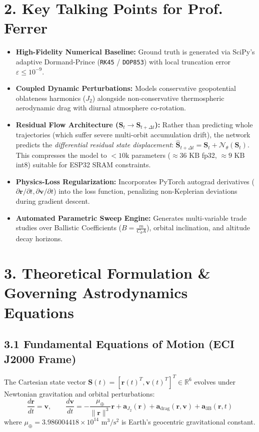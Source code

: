 \documentclass[11pt,a4paper]{article}
\begin{document}
\section*{2. Key Talking Points for Prof. Ferrer}
\begin{itemize}[leftmargin=*,itemsep=2pt]
    \item \textbf{High-Fidelity Numerical Baseline:} Ground truth is generated via SciPy's adaptive Dormand-Prince (\texttt{RK45} / \texttt{DOP853}) with local truncation error $\varepsilon \le 10^{-9}$.
    \item \textbf{Coupled Dynamic Perturbations:} Models conservative geopotential oblateness harmonics ($J_2$) alongside non-conservative thermospheric aerodynamic drag with diurnal atmosphere co-rotation.
    \item \textbf{Residual Flow Architecture ($\mathbf{S}_t \to \mathbf{S}_{t+\Delta t}$):} Rather than predicting whole trajectories (which suffer severe multi-orbit accumulation drift), the network predicts the \textit{differential residual state displacement}: $\hat{\mathbf{S}}_{t+\Delta t} = \mathbf{S}_t + \mathcal{N}_\theta(\mathbf{S}_t)$. This compresses the model to $<10\text{k}$ parameters ($\approx 36\text{ KB}$ fp32, $\approx 9\text{ KB}$ int8) suitable for ESP32 SRAM constraints.
    \item \textbf{Physics-Loss Regularization:} Incorporates PyTorch autograd derivatives ($\partial \mathbf{r}/\partial t, \partial \mathbf{v}/\partial t$) into the loss function, penalizing non-Keplerian deviations during gradient descent.
    \item \textbf{Automated Parametric Sweep Engine:} Generates multi-variable trade studies over Ballistic Coefficients ($B = \frac{m}{C_d A}$), orbital inclination, and altitude decay horizons.
\end{itemize}

\vspace{6pt}
\section*{3. Theoretical Formulation \& Governing Astrodynamics Equations}

\subsection*{3.1 Fundamental Equations of Motion (ECI J2000 Frame)}
The Cartesian state vector $\mathbf{S}(t) = [\mathbf{r}(t)^T, \mathbf{v}(t)^T]^T \in \mathbb{R}^6$ evolves under Newtonian gravitation and orbital perturbations:
\begin{equation}
    \frac{d\mathbf{r}}{dt} = \mathbf{v}, \qquad \frac{d\mathbf{v}}{dt} = -\frac{\mu_\oplus}{\|\mathbf{r}\|^3}\mathbf{r} + \mathbf{a}_{J_2}(\mathbf{r}) + \mathbf{a}_{\text{drag}}(\mathbf{r}, \mathbf{v}) + \mathbf{a}_{3\text{B}}(\mathbf{r}, t)
\end{equation}
where $\mu_\oplus = 3.986004418 \times 10^{14}\text{ m}^3/\text{s}^2$ is Earth's geocentric gravitational constant.
\end{document}
